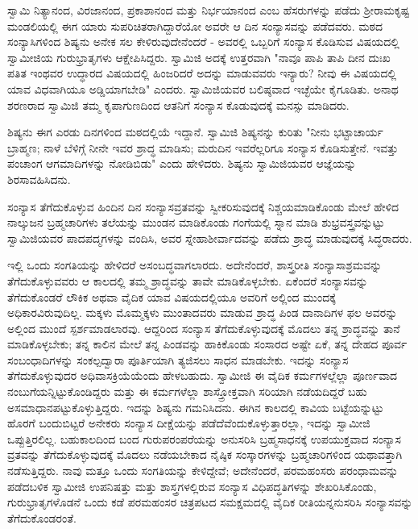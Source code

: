 ಸ್ವಾಮಿ ನಿತ್ಯಾನಂದ, ವಿರಜಾನಂದ, ಪ್ರಕಾಶಾನಂದ ಮತ್ತು ನಿರ್ಭಯಾನಂದ ಎಂಬ ಹೆಸರುಗಳನ್ನು ಪಡೆದು ಶ‍್ರೀರಾಮಕೃಷ್ಟ ಮಂಡಲಿಯಲ್ಲಿ ಈಗ ಯಾರು ಸುಪರಿಚಿತರಾಗಿದ್ದಾರೆಯೋ ಅವರೇ ಆ ದಿನ ಸಂನ್ಯಾಸವನ್ನು ಪಡೆದವರು. ಮಠದ ಸಂನ್ಯಾಸಿಗಳಿಂದ ಶಿಷ್ಯನು ಅನೇಕ ಸಲ ಕೇಳಿರುವುದೇನೆಂದರೆ - ಅವರಲ್ಲಿ ಒಬ್ಬರಿಗೆ ಸಂನ್ಯಾಸ ಕೊಡಿಸುವ ವಿಷಯದಲ್ಲಿ ಸ್ವಾಮೀಜಿಯ ಗುರುಭ್ರಾತೃಗಳು ಆಕ್ಷೇಪಿಸಿದ್ದರು. ಸ್ವಾಮಿಜಿ ಅದಕ್ಕೆ ಉತ್ತರವಾಗಿ "ನಾವೂ ಪಾಪಿ ತಾಪಿ ದೀನ ದುಃಖ ಪತಿತ ಇಂಥವರ ಉದ್ಧಾರದ ವಿಷಯದಲ್ಲಿ ಹಿಂಜರಿದರೆ ಅದನ್ನು ಮಾಡುವವರು ಇನ್ಯಾರು? ನೀವು ಈ ವಿಷಯದಲ್ಲಿ ಯಾವ ವಿಧವಾಗಿಯೂ ಅಡ್ಡಿಯಾಗಬೇಡಿ" ಎಂದರು. ಸ್ವಾಮಿಜಿಯವರ ಬಲಿಷ್ಠವಾದ ಇಚ್ಛೆಯೇ ಕೈಗೂಡಿತು. ಅನಾಥ ಶರಣರಾದ ಸ್ವಾಮಿಜಿ ತಮ್ಮ ಕೃಪಾಗುಣದಿಂದ ಆತನಿಗೆ ಸಂನ್ಯಾಸ ಕೊಡುವುದಕ್ಕೆ ಮನಸ್ಸು ಮಾಡಿದರು.

ಶಿಷ್ಯನು ಈಗ ಎರಡು ದಿನಗಳಿಂದ ಮಠದಲ್ಲಿಯೆ ಇದ್ದಾನೆ. ಸ್ವಾಮಿಜಿ ಶಿಷ್ಯನನ್ನು ಕುರಿತು "ನೀನು ಭಟ್ಟಾಚಾರ್ಯ ಬ್ರಾಹ್ಮಣ; ನಾಳೆ ಬೆಳಿಗ್ಗೆ ನೀನೇ ಇವರ ಶ್ರಾದ್ಧ ಮಾಡಿಸು; ಮರುದಿನ ಇವರೆಲ್ಲರಿಗೂ ಸಂನ್ಯಾಸ ಕೊಡಿಸುತ್ತೇನೆ. ಇವತ್ತು ಪಂಚಾಂಗ ಆಗಮಾದಿಗಳನ್ನು ನೋಡಿಬಿಡು" ಎಂದು ಹೇಳಿದರು. ಶಿಷ್ಯನು ಸ್ವಾಮಿಜಿಯವರ ಆಜ್ಞೆಯನ್ನು ಶಿರಸಾವಹಿಸಿದನು.

ಸಂನ್ಯಾಸ ತೆಗೆದುಕೊಳ್ಳುವ ಹಿಂದಿನ ದಿನ ಸಂನ್ಯಾಸವ್ರತವನ್ನು ಸ್ವೀಕರಿಸುವುದಕ್ಕೆ ನಿಶ್ಚಯಮಾಡಿಕೊಂಡು ಮೇಲೆ ಹೇಳಿದ ನಾಲ್ಕುಜನ ಬ್ರಹ್ಮಚಾರಿಗಳು ತಲೆಯನ್ನು ಮುಂಡನ ಮಾಡಿಕೊಂಡು ಗಂಗೆಯಲ್ಲಿ ಸ್ನಾನ ಮಾಡಿ ಶುಭ್ರವಸ್ತ್ರವನ್ನುಟ್ಟು ಸ್ವಾಮಿಜಿಯವರ ಪಾದಪದ್ಮಗಳನ್ನು ವಂದಿಸಿ, ಅವರ ಸ್ನೇಹಾಶೀರ್ವಾದವನ್ನು ಪಡೆದು ಶ್ರಾದ್ಧ ಮಾಡುವುದಕ್ಕೆ ಸಿದ್ಧರಾದರು.

ಇಲ್ಲಿ ಒಂದು ಸಂಗತಿಯನ್ನು ಹೇಳಿದರೆ ಅಸಂಬದ್ಧವಾಗಲಾರದು. ಅದೇನೆಂದರೆ, ಶಾಸ್ತ್ರರೀತಿ ಸಂನ್ಯಾಸಾಶ್ರಮವನ್ನು ತೆಗೆದುಕೊಳ್ಳುವವರು ಆ ಕಾಲದಲ್ಲಿ ತಮ್ಮ ಶ್ರಾದ್ಧವನ್ನು ತಾವೇ ಮಾಡಿಕೊಳ್ಳಬೇಕು. ಏಕೆಂದರೆ ಸಂನ್ಯಾಸವನ್ನು ತೆಗೆದುಕೊಂಡರೆ ಲೌಕಿಕ ಅಥವಾ ವೈದಿಕ ಯಾವ ವಿಷಯದಲ್ಲಿಯೂ ಅವರಿಗೆ ಅಲ್ಲಿಂದ ಮುಂದಕ್ಕೆ ಅಧಿಕಾರವಿರುವುದಿಲ್ಲ. ಮಕ್ಕಳು ಮೊಮ್ಮಕ್ಕಳು ಮುಂತಾದವರು ಮಾಡುವ ಶ್ರಾದ್ಧ ಪಿಂಡ ದಾನಾದಿಗಳ ಫಲ ಅವರನ್ನು ಅಲ್ಲಿಂದ ಮುಂದೆ ಸ್ಪರ್ಶಮಾಡಲಾರವು. ಆದ್ದರಿಂದ ಸಂನ್ಯಾಸ ತೆಗೆದುಕೊಳ್ಳುವುದಕ್ಕೆ ಮೊದಲು ತನ್ನ ಶ್ರಾದ್ಧವನ್ನು ತಾನೆ ಮಾಡಿಕೊಳ್ಳಬೇಕು; ತನ್ನ ಕಾಲಿನ ಮೇಲೆ ತನ್ನ ಪಿಂಡವನ್ನು ಹಾಕಿಕೊಂಡು ಸಂಸಾರದ ಅಷ್ಟೇ ಏಕೆ, ತನ್ನ ದೇಹದ ಪೂರ್ವ ಸಂಬಂಧಾದಿಗಳನ್ನು ಸಂಕಲ್ಪದ್ವಾರಾ ಪೂರ್ತಿಯಾಗಿ ತ್ಯಜಿಸಲು ಸಾಧನ ಮಾಡಬೇಕು. ಇದನ್ನು ಸಂನ್ಯಾಸ ತೆಗೆದುಕೊಳ್ಳುವುದರ ಅಧಿವಾಸಕ್ರಿಯೆಯೆಂದು ಹೇಳಬಹುದು. ಸ್ವಾಮೀಜಿ ಈ ವೈದಿಕ ಕರ್ಮಗಳಲ್ಲೆಲ್ಲಾ ಪೂರ್ಣವಾದ ನಂಬುಗೆಯನ್ನಿಟ್ಟುಕೊಂಡಿದ್ದರು ಮತ್ತು ಈ ಕರ್ಮಗಳೆಲ್ಲಾ ಶಾಸ್ತ್ರೋಕ್ತವಾಗಿ ಸರಿಯಾಗಿ ನಡೆಯದಿದ್ದರೆ ಬಹು ಅಸಮಾಧಾನಪಟ್ಟುಕೊಳ್ಳುತ್ತಿದ್ದರು. ಇದನ್ನು ಶಿಷ್ಯನು ಗಮನಿಸಿದನು. ಈಗಿನ ಕಾಲದಲ್ಲಿ ಕಾವಿಯ ಬಟ್ಟೆಯನ್ನುಟ್ಟು ಹೊರಗೆ ಬಂದುಬಿಟ್ಟರೆ ಅನೇಕರು ಸಂನ್ಯಾಸ ದೀಕ್ಷೆಯನ್ನು ಪಡೆದೆವೆಂದುಕೊಳ್ಳುತ್ತಾರಲ್ಲಾ, ಇದನ್ನು ಸ್ವಾಮೀಜಿ ಒಪ್ಪುತ್ತಿರಲಿಲ್ಲ. ಬಹುಕಾಲದಿಂದ ಬಂದ ಗುರುಪರಂಪರೆಯನ್ನು ಅನುಸರಿಸಿ ಬ್ರಹ್ಮಸಾಧನಕ್ಕೆ ಉಪಯುಕ್ತವಾದ ಸಂನ್ಯಾಸ ವ್ರತವನ್ನು ತೆಗೆದುಕೊಳ್ಳುವುದಕ್ಕೆ ಮೊದಲು ನಡೆಯಬೇಕಾದ ನೈಷ್ಠಿಕ ಸಂಸ್ಕಾರಗಳನ್ನು ಬ್ರಹ್ಮಚಾರಿಗಳಿಂದ ಯಥಾವತ್ತಾಗಿ ನಡೆಸುತ್ತಿದ್ದರು. ನಾವು ಮತ್ತೂ ಒಂದು ಸಂಗತಿಯನ್ನು ಕೇಳಿದ್ದೇವೆ; ಅದೇನೆಂದರೆ, ಪರಮಹಂಸರು ಪರಂಧಾಮವನ್ನು ಪಡೆದಬಳಿಕ ಸ್ವಾಮೀಜಿ ಉಪನಿಷತ್ತು ಮತ್ತು ಶಾಸ್ತ್ರಗಳಲ್ಲಿರುವ ಸಂನ್ಯಾಸ ವಿಧಿಪದ್ಧತಿಗಳನ್ನು ಶೇಖರಿಸಿಕೊಂಡು, ಗುರುಭ್ರಾತೃಗಳೊಡನೆ ಒಂದು ಕಡೆ ಪರಮಹಂಸರ ಚಿತ್ರಪಟದ ಸಮಕ್ಷಮದಲ್ಲಿ ವೈದಿಕ ರೀತಿಯನ್ನನುಸರಿಸಿ ಸಂನ್ಯಾಸವನ್ನು ತೆಗೆದುಕೊಂಡರಂತೆ.

